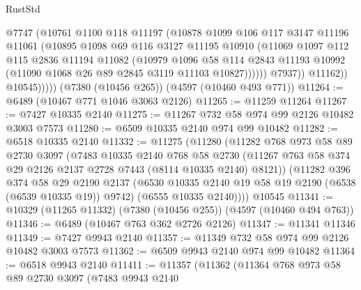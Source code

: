 \begin{lexlean}{RustStd}
\begin{coremodule}
                      @7747
                      (@10761
                        @1100
                        @118
                        @11197
                        (@10878
                          @1099
                          @106
                          @117
                          @3147
                          @11196
                          @11061
                          (@10895
                            @1098
                            @69
                            @116
                            @3127
                            @11195
                            @10910
                            (@11069
                              @1097
                              @112
                              @115
                              @2836
                              @11194
                              @11082
                              (@10979
                                @1096
                                @58
                                @114
                                @2843
                                @11193
                                @10992
                                (@11090 @1068 @26 @89 @2845 @3119 @11103 @10827))))))
                      @7937))
                  @11162))
              @10545)))))
    (@7380 (@10456 @265))
    (@4597 (@10460 @493 @771))
@11264 := @6489 (@10467 @771 @1046 @3063 @2126)
@11265 := @11259 @11264
@11267 := @7427 @10335 @2140
@11275 := @11267 @732 @58 @974 @99 @2126 @10482 @3003 @7573
@11280 := @6509 @10335 @2140 @974 @99 @10482
@11282 := @6518 @10335 @2140
@11332 := @11275
    (@11280
      (@11282
        @768
        @973
        @58
        @89
        @2730
        @3097
        (@7483
          @10335
          @2140
          @768
          @58
          @2730
          (@11267 @763 @58 @374 @29 @2126 @2137 @2728 @7443 (@8114 @10335 @2140) @8121))
        (@11282
          @396
          @374
          @58
          @29
          @2190
          @2137
          (@6530 @10335 @2140 @19 @58 @19 @2190 (@6538 (@6539 @10335 @19)) @9742)
          (@6555 @10335 @2140))))
    @10545
@11341 := @10329 (@11265 @11332) (@7380 (@10456 @255)) (@4597 (@10460 @494 @763))
@11346 := @6489 (@10467 @763 @362 @2726 @2126)
@11347 := @11341 @11346
@11349 := @7427 @9943 @2140
@11357 := @11349 @732 @58 @974 @99 @2126 @10482 @3003 @7573
@11362 := @6509 @9943 @2140 @974 @99 @10482
@11364 := @6518 @9943 @2140
@11411 := @11357
    (@11362
      (@11364
        @768
        @973
        @58
        @89
        @2730
        @3097
        (@7483
          @9943
          @2140

\end{coremodule}
\end{lexlean}

